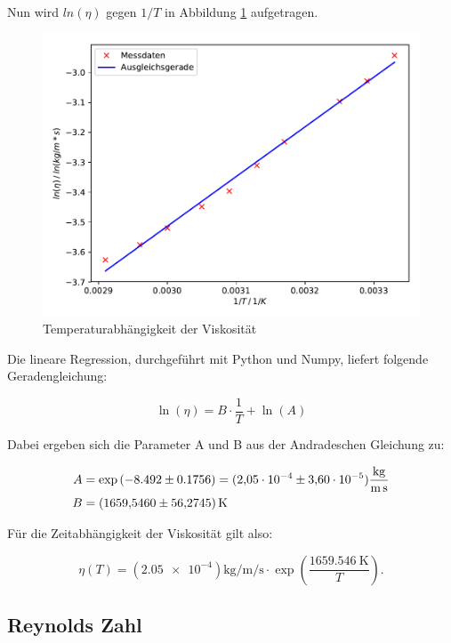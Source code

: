 Nun wird $ln(\eta)$ gegen $1/T$ in Abbildung \ref{fig:plot} aufgetragen.

\begin{figure}
  \centering
  \includegraphics[scale=0.7]{content/plot1.pdf}
  \caption{Temperaturabhängigkeit der Viskosität}
  \label{fig:plot}
\end{figure}

Die lineare Regression, durchgeführt mit Python und Numpy, 
liefert folgende Geradengleichung: 

\begin{equation*}
\ln{(\eta)} = B\cdot \frac{1}{T} + \ln{(A)}
\end{equation*}

Dabei ergeben sich die Parameter A und B aus der Andradeschen Gleichung zu: 

\begin{align*}
A &= \exp{(-8.492\pm0.1756)} = (\num{2.05e-4}\pm\num{3.60e-5})\si{\kilo\gram\per\meter\per\second} \\
B &= \SI{1659.546+-56.2745}{\kelvin}
\end{align*}

Für die Zeitabhängigkeit der Viskosität gilt also:

\begin{equation*}
\eta (T) = (\num{2.05e-4})\si{\kilo\gram\per\meter\per\second} \cdot \exp{\left(\frac{\SI{1659.546}{\kelvin}}{T}\right)}.
\end{equation*}

\subsection{Reynolds Zahl}

